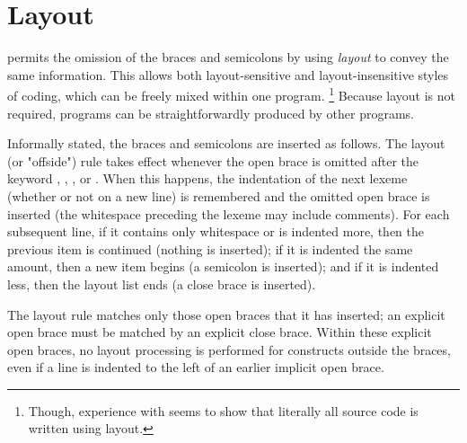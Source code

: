 \section{Layout} \label{layout}

\frege{} permits the omission of the braces and semicolons by using \emph{layout} to convey the same information.
This allows both layout-sensitive and layout-insensitive styles of coding, which can be freely mixed within one program.
\footnote{Though, experience with \haskell{} seems to show that literally all source code is written using layout.}
Because layout is not required, \frege{} programs can be straightforwardly produced by other programs.

Informally stated, the braces and semicolons are inserted as follows.
The layout (or "offside") rule takes effect whenever the open brace is omitted after the keyword , , , or .
When this happens, the indentation of the next lexeme (whether or not on a new line) is remembered and the omitted open brace is inserted (the whitespace preceding the lexeme may include comments).
For each subsequent line, if it contains only whitespace or is indented more, then the previous item is continued (nothing is inserted);
if it is indented the same amount, then a new item begins (a semicolon is inserted);
and if it is indented less, then the layout list ends (a close brace is inserted).

The layout rule matches only those open braces that it has inserted; an explicit open brace must be matched by an explicit close brace.
Within these explicit open braces, no layout processing is performed for constructs outside the braces, even if a line is indented to the left of an earlier implicit open brace.

